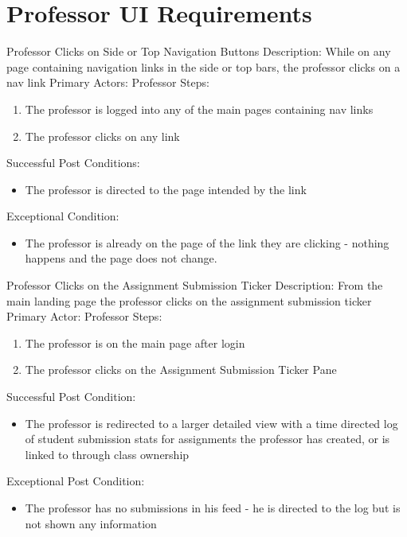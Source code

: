\chapter{Professor UI Requirements}

    \begin{section}{Professor Clicks on Side or Top Navigation Buttons}
        Description: While on any page containing navigation links in the side or top bars, the professor clicks on a nav link \newline
        Primary Actors: Professor \newline
        Steps:
        \begin{enumerate}
            \item{The professor is logged into any of the main pages containing nav links}
            \item{The professor clicks on any link}
        \end{enumerate}
        Successful Post Conditions:
        \begin{itemize}
          \item{The professor is directed to the page intended by the link}
        \end{itemize}
        Exceptional Condition:
        \begin{itemize}
           \item{The professor is already on the page of the link they are clicking - nothing happens and the page does not change.}
        \end{itemize}
    \end{section}
    
    \begin{section}{Professor Clicks on the Assignment Submission Ticker}
        Description: From the main landing page the professor clicks on the assignment submission ticker \newline 
        Primary Actor: Professor \newline
        Steps:
        \begin{enumerate}
            \item{The professor is on the main page after login}
            \item{The professor clicks on the Assignment Submission Ticker Pane}
        \end{enumerate}
        Successful Post Condition:
        \begin{itemize}
            \item{The professor is redirected to a larger detailed view with a time directed log of student submission stats for assignments the professor has created, or is linked to through class ownership}
        \end{itemize}
        Exceptional Post Condition:
        \begin{itemize}
            \item{The professor has no submissions in his feed - he is directed to the log but is not shown any information}
        \end{itemize}
    \end{section}
    
